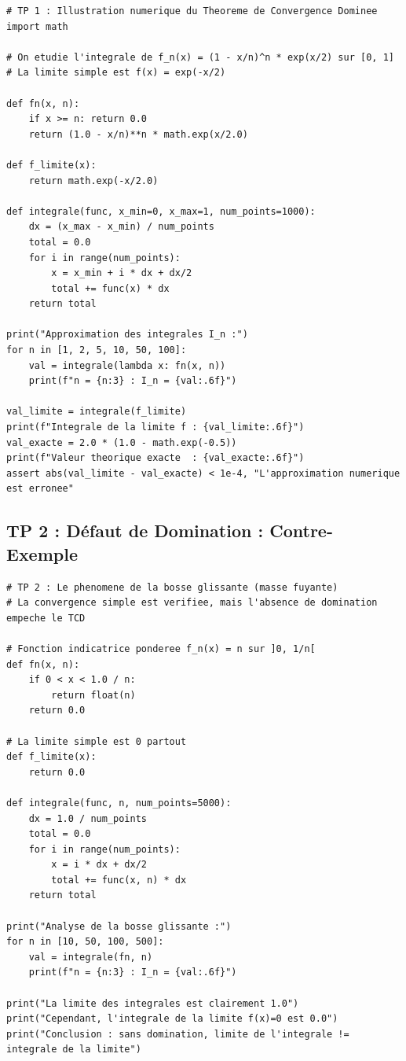 \documentclass[11pt,a4paper]{article}
\begin{document}
\begin{lstlisting}
# TP 1 : Illustration numerique du Theoreme de Convergence Dominee
import math

# On etudie l'integrale de f_n(x) = (1 - x/n)^n * exp(x/2) sur [0, 1]
# La limite simple est f(x) = exp(-x/2)

def fn(x, n):
    if x >= n: return 0.0
    return (1.0 - x/n)**n * math.exp(x/2.0)

def f_limite(x):
    return math.exp(-x/2.0)

def integrale(func, x_min=0, x_max=1, num_points=1000):
    dx = (x_max - x_min) / num_points
    total = 0.0
    for i in range(num_points):
        x = x_min + i * dx + dx/2
        total += func(x) * dx
    return total

print("Approximation des integrales I_n :")
for n in [1, 2, 5, 10, 50, 100]:
    val = integrale(lambda x: fn(x, n))
    print(f"n = {n:3} : I_n = {val:.6f}")

val_limite = integrale(f_limite)
print(f"Integrale de la limite f : {val_limite:.6f}")
val_exacte = 2.0 * (1.0 - math.exp(-0.5))
print(f"Valeur theorique exacte  : {val_exacte:.6f}")
assert abs(val_limite - val_exacte) < 1e-4, "L'approximation numerique est erronee"
\end{lstlisting}

\subsection*{TP 2 : Défaut de Domination : Contre-Exemple}

\begin{lstlisting}
# TP 2 : Le phenomene de la bosse glissante (masse fuyante)
# La convergence simple est verifiee, mais l'absence de domination empeche le TCD

# Fonction indicatrice ponderee f_n(x) = n sur ]0, 1/n[
def fn(x, n):
    if 0 < x < 1.0 / n:
        return float(n)
    return 0.0

# La limite simple est 0 partout
def f_limite(x):
    return 0.0

def integrale(func, n, num_points=5000):
    dx = 1.0 / num_points
    total = 0.0
    for i in range(num_points):
        x = i * dx + dx/2
        total += func(x, n) * dx
    return total

print("Analyse de la bosse glissante :")
for n in [10, 50, 100, 500]:
    val = integrale(fn, n)
    print(f"n = {n:3} : I_n = {val:.6f}")

print("La limite des integrales est clairement 1.0")
print("Cependant, l'integrale de la limite f(x)=0 est 0.0")
print("Conclusion : sans domination, limite de l'integrale != integrale de la limite")
\end{lstlisting}
\end{document}

